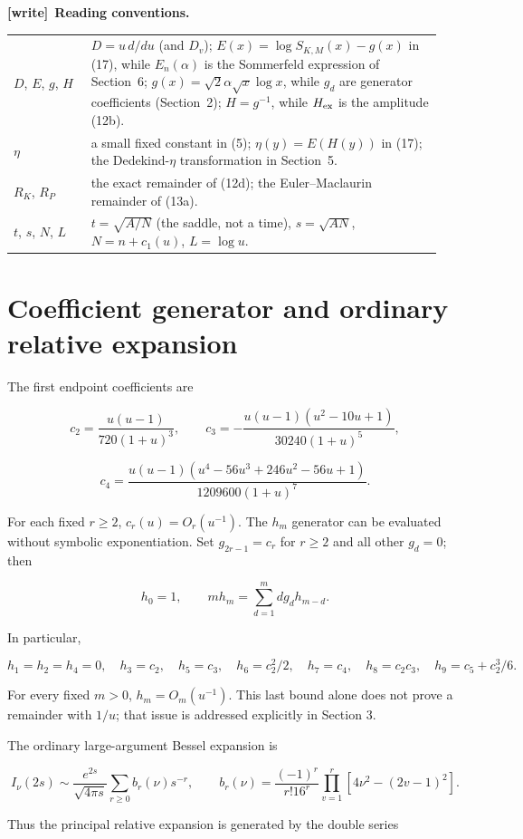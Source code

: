 \documentclass[11pt,letterpaper]{article}
\newenvironment{writenote}[1][]{\par\smallskip\begingroup\small
 \noindent\textbf{[write]}\if\relax\detokenize{#1}\relax\else~\textbf{#1.}\fi\ }%
 {\par\endgroup\smallskip}
\begin{document}
\begin{writenote}[Reading conventions]
\begin{tabular}{@{}>{\raggedright\arraybackslash}p{0.17\linewidth}
 >{\raggedright\arraybackslash}p{0.77\linewidth}@{}}
$D$, $E$, $g$, $H$ & $D=u\,d/du$ (and $D_v$); $E(x)=\log S_{K,M}(x)-g(x)$
 in (17), while $E_n(\alpha)$ is the Sommerfeld expression of Section~6;
 $g(x)=\sqrt2\alpha\sqrt x\log x$, while $g_d$ are generator coefficients
 (Section~2); $H=g^{-1}$, while $H_{\rm ex}$ is the amplitude (12b). \\
$\eta$ & a small fixed constant in (5); $\eta(y)=E(H(y))$ in (17); the
 Dedekind-$\eta$ transformation in Section~5. \\
$R_K$, $R_P$ & the exact remainder of (12d); the Euler--Maclaurin remainder
 of (13a). \\
$t$, $s$, $N$, $L$ & $t=\sqrt{A/N}$ (the saddle, not a time), $s=\sqrt{AN}$,
 $N=n+c_1(u)$, $L=\log u$. \\
\bottomrule
\end{tabular}
\end{writenote}

\section{Coefficient generator and ordinary relative
expansion}\label{mfp:coefficient-generator-and-ordinary-relative-expansion}

The first endpoint coefficients are

\[
 c_2=\frac{u(u-1)}{720(1+u)^3},\qquad
 c_3=-\frac{u(u-1)(u^2-10u+1)}{30240(1+u)^5},
\]

\[
 c_4=\frac{u(u-1)(u^4-56u^3+246u^2-56u+1)}{1209600(1+u)^7}.
\]

For each fixed \(r\ge2\), \(c_r(u)=O_r(u^{-1})\). The \(h_m\) generator
can be evaluated without symbolic exponentiation. Set \(g_{2r-1}=c_r\)
for \(r\ge2\) and all other \(g_d=0\); then

\[
 h_0=1,\qquad m h_m=\sum_{d=1}^m d g_d h_{m-d}.
\]

In particular,

\[
 h_1=h_2=h_4=0,\quad h_3=c_2,\quad h_5=c_3,\quad
 h_6=c_2^2/2,\quad h_7=c_4,\quad h_8=c_2c_3,\quad
 h_9=c_5+c_2^3/6.
\]

For every fixed \(m>0\), \(h_m=O_m(u^{-1})\). This last bound alone does
not prove a remainder with \(1/u\); that issue is addressed explicitly
in Section 3.

The ordinary large-argument Bessel expansion is

\[
 I_\nu(2s)\sim\frac{e^{2s}}{\sqrt{4\pi s}}
 \sum_{r\ge0}b_r(\nu)s^{-r},\qquad
 b_r(\nu)=\frac{(-1)^r}{r!16^r}\prod_{v=1}^r[4\nu^2-(2v-1)^2].
\]

Thus the principal relative expansion is generated by the double series
\end{document}
